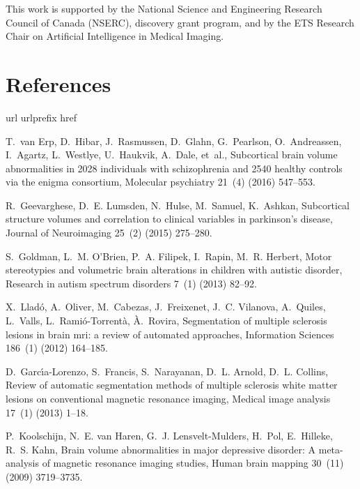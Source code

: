 \documentclass[twoside,fleqn,espcrc2]{elsarticle}
\begin{document}
This work is supported by the National Science and Engineering Research Council of Canada (NSERC), discovery grant program, and by the ETS Research Chair on Artificial Intelligence in Medical Imaging.

\section*{References}

%

\begin{thebibliography}{10}
\expandafter\ifx\csname url\endcsname\relax
  \def\url#1{\texttt{#1}}\fi
\expandafter\ifx\csname urlprefix\endcsname\relax\def\urlprefix{URL }\fi
\expandafter\ifx\csname href\endcsname\relax
  \def\href#1#2{#2} \def\path#1{#1}\fi

T.~van Erp, D.~Hibar, J.~Rasmussen, D.~Glahn, G.~Pearlson, O.~Andreassen, I.~Agartz, L.~Westlye, U.~Haukvik, A.~Dale, et~al., Subcortical brain volume abnormalities in 2028 individuals with schizophrenia and 2540 healthy controls via the enigma consortium, Molecular psychiatry 21~(4) (2016) 547--553.

R.~Geevarghese, D.~E. Lumsden, N.~Hulse, M.~Samuel, K.~Ashkan, Subcortical
  structure volumes and correlation to clinical variables in parkinson's
  disease, Journal of Neuroimaging 25~(2) (2015) 275--280.

S.~Goldman, L.~M. O'Brien, P.~A. Filipek, I.~Rapin, M.~R. Herbert, Motor
  stereotypies and volumetric brain alterations in children with autistic
  disorder, Research in autism spectrum disorders 7~(1) (2013) 82--92.

X.~Llad{\'o}, A.~Oliver, M.~Cabezas, J.~Freixenet, J.~C. Vilanova, A.~Quiles,
  L.~Valls, L.~Rami{\'o}-Torrent{\`a}, {\`A}.~Rovira, Segmentation of multiple
  sclerosis lesions in brain mri: a review of automated approaches, Information
  Sciences 186~(1) (2012) 164--185.

D.~Garc{\'\i}a-Lorenzo, S.~Francis, S.~Narayanan, D.~L. Arnold, D.~L. Collins,
  Review of automatic segmentation methods of multiple sclerosis white matter
  lesions on conventional magnetic resonance imaging, Medical image analysis
  17~(1) (2013) 1--18.

P.~Koolschijn, N.~E. van Haren, G.~J. Lensvelt-Mulders, H.~Pol, E.~Hilleke,
  R.~S. Kahn, Brain volume abnormalities in major depressive disorder: A
  meta-analysis of magnetic resonance imaging studies, Human brain mapping
  30~(11) (2009) 3719--3735.


\end{thebibliography}
\end{document}
